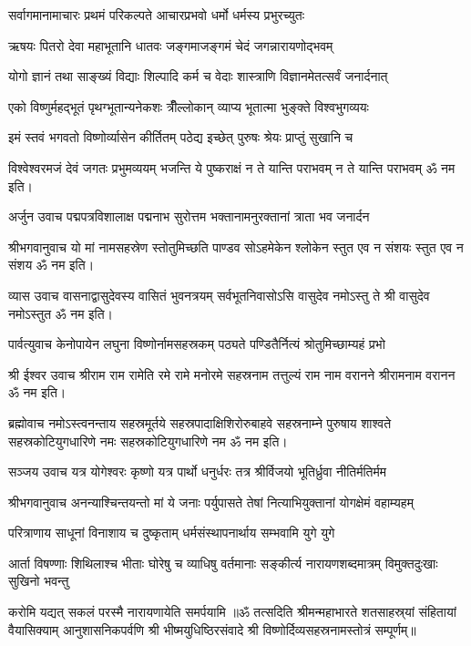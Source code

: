 \twolineshloka
{सर्वागमानामाचारः प्रथमं परिकल्पते}
{आचारप्रभवो धर्मो धर्मस्य प्रभुरच्युतः}

\twolineshloka
{ऋषयः पितरो देवा महाभूतानि धातवः}
{जङ्गमाजङ्गमं चेदं जगन्नारायणोद्भवम्}

\twolineshloka
{योगो ज्ञानं तथा साङ्ख्यं विद्याः शिल्पादि कर्म च}
{वेदाः शास्त्राणि विज्ञानमेतत्सर्वं जनार्दनात्}

\twolineshloka
{एको विष्णुर्महद्भूतं पृथग्भूतान्यनेकशः}
{त्रीँल्लोकान् व्याप्य भूतात्मा भुङ्क्ते विश्वभुगव्ययः}

\twolineshloka
{इमं स्तवं भगवतो विष्णोर्व्यासेन कीर्तितम्}
{पठेद्य इच्छेत् पुरुषः श्रेयः प्राप्तुं सुखानि च}

\twolineshloka
{विश्वेश्वरमजं देवं जगतः प्रभुमव्ययम्}
{भजन्ति ये पुष्कराक्षं न ते यान्ति पराभवम्}
न ते यान्ति पराभवम् ॐ नम इति।

अर्जुन उवाच\nopagebreak[4]
\twolineshloka
{पद्मपत्रविशालाक्ष पद्मनाभ सुरोत्तम}
{भक्तानामनुरक्तानां त्राता भव जनार्दन}

श्रीभगवानुवाच\nopagebreak[4]
\twolineshloka
{यो मां नामसहस्रेण स्तोतुमिच्छति पाण्डव}
{सोऽहमेकेन श्लोकेन स्तुत एव न संशयः}
स्तुत एव न संशय ॐ नम इति।

व्यास उवाच\nopagebreak[4]
\twolineshloka
{वासनाद्वासुदेवस्य वासितं भुवनत्रयम्}
{सर्वभूतनिवासोऽसि वासुदेव नमोऽस्तु ते}
श्री वासुदेव नमोऽस्तुत ॐ नम इति।

पार्वत्युवाच\nopagebreak[4]
\twolineshloka
{केनोपायेन लघुना विष्णोर्नामसहस्रकम्}
{पठ्यते पण्डितैर्नित्यं श्रोतुमिच्छाम्यहं प्रभो}

श्री ईश्वर उवाच\nopagebreak[4]
\twolineshloka
{श्रीराम राम रामेति रमे रामे मनोरमे}
{सहस्रनाम तत्तुल्यं राम नाम वरानने}%
श्रीरामनाम वरानन ॐ नम इति।

ब्रह्मोवाच\nopagebreak[4]
\twolineshloka
{नमोऽस्त्वनन्ताय सहस्रमूर्तये सहस्रपादाक्षिशिरोरुबाहवे}
{सहस्रनाम्ने पुरुषाय शाश्वते सहस्रकोटियुगधारिणे नमः}
सहस्रकोटियुगधारिणे नम ॐ नम इति।

सञ्जय उवाच\nopagebreak[4]
\twolineshloka
{यत्र योगेश्वरः कृष्णो यत्र पार्थो धनुर्धरः}
{तत्र श्रीर्विजयो भूतिर्ध्रुवा नीतिर्मतिर्मम}

श्रीभगवानुवाच\nopagebreak[4]
\twolineshloka
{अनन्याश्चिन्तयन्तो मां ये जनाः पर्युपासते}
{तेषां नित्याभियुक्तानां योगक्षेमं वहाम्यहम्}

\twolineshloka
{परित्राणाय साधूनां विनाशाय च दुष्कृताम्}
{धर्मसंस्थापनार्थाय सम्भवामि युगे युगे}

\fourlineindentedshloka
{आर्ता विषण्णाः शिथिलाश्च भीताः}
{घोरेषु च व्याधिषु वर्तमानाः}
{सङ्कीर्त्य नारायणशब्दमात्रम्}
{विमुक्तदुःखाः सुखिनो भवन्तु}

{करोमि यद्यत् सकलं परस्मै नारायणायेति समर्पयामि}
॥ॐ तत्सदिति श्रीमन्महाभारते शतसाहस्र्यां संहितायां वैयासिक्याम् आनुशासनिकपर्वणि श्री भीष्मयुधिष्ठिरसंवादे श्री विष्णोर्दिव्यसहस्रनामस्तोत्रं सम्पूर्णम्॥
\setlength{\shlokaspaceskip}{24pt}
